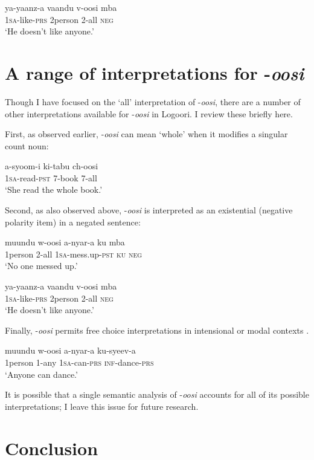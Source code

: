 \documentclass[output=paper]{langsci/langscibook}
\begin{document}
\ea
\gll ya-yaanz-a  vaandu   v-oosi    mba \\
     1\textsc{sa}{}-like-\textsc{prs}  2person     2-all    \textsc{neg}\\
\glt ‘He doesn't like anyone.’
\z

\section{A range of interpretations for -\textit{oosi}}

Though I have focused on the ‘all’ interpretation of -\textit{oosi}, there are a number of other interpretations available for -\textit{oosi} in Logoori. I review these briefly here.

  First, as observed earlier, -\textit{oosi} can mean ‘whole’ when it modifies a singular count noun:

\ea
\gll a-syoom-i  ki-tabu  ch-oosi\\
     1\textsc{sa}{}-read-\textsc{pst}    7-book\textsc{  7-}all \\
\glt ‘She read the whole book.’
\z

  Second, as also observed above, -\textit{oosi} is interpreted as an existential (negative polarity item) in a negated sentence:  

\ea 
\gll muundu  w-oosi    a-nyar-a    ku  mba  \\
     1person  2-all    1\textsc{sa}{}-mess.up-\textsc{pst}  \textsc{ku  neg}\\
\glt ‘No one messed up.’       \textit{} 
\z

\ea
\gll ya-yaanz-a  vaandu   v-oosi    mba \\
     1\textsc{sa}{}-like-\textsc{prs}  2person     2-all    \textsc{neg}\\
\glt ‘He doesn't like anyone.’
\z

  Finally, -\textit{oosi} permits free choice interpretations in intensional or modal contexts .

\ea
\gll muundu  w-oosi    a-nyar-a  ku-syeev-a\\
     1person  1-any    1\textsc{sa}{}-can-\textsc{prs  inf-}dance-\textsc{prs} \\
\glt ‘Anyone can dance.’
\z

  It is possible that a single semantic analysis of -\textit{oosi} accounts for all of its possible interpretations; I leave this issue for future research. 

\section{Conclusion}
\end{document}

